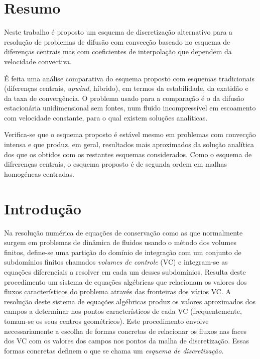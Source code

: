 \documentclass[11pt,twoside]{article}
\begin{document}
{\setlength{\parindent}{30pt}%

\small%
\section*{Resumo}
\smallskip
Neste trabalho é proposto um esquema de discretização alternativo para a
resolução de problemas de difusão com convecção baseado no esquema de diferenças
centrais mas com coeficientes de interpolação que dependem da velocidade
convectiva.

É feita uma análise comparativa do esquema proposto com esquemas tradicionais
(diferenças centrais, \emph{upwind}, híbrido), em termos da estabilidade, da
exatidão e da taxa de convergência. O problema usado para a comparação é o da
difusão estacionária unidimensional sem fontes, num fluido incompressível em
escoamento com velocidade constante, para o qual existem soluções analíticas.

Verifica-se que o esquema proposto é estável mesmo em problemas com convecção
intensa e que produz, em geral, resultados mais aproximados da solução analítica
dos que os obtidos com os restantes esquemas considerados. Como o esquema de
difrerenças centrais, o esquema proposto é de segunda ordem em malhas homogéneas
centradas.

\vspace{15pt}





\section{Introdução}
Na resolução numérica de equações de conservação como as que normalmente surgem
em problemas de dinâmica de fluidos usando o método dos volumes finitos,
define-se uma partição do domínio de integração com um conjunto de subdomínios
finitos chamados \emph{volumes de controle} (VC) e integram-se as equações
diferenciais a resolver em cada um desses subdomínios. Resulta deste
procedimento um sistema de equações algébricas que relacionam os valores dos
fluxos característicos do problema através das fronteiras dos vários VC. A
resolução deste sistema de equações algébricas produz os valores aproximados dos
campos a determinar nos pontos característicos de cada VC (frequentemente,
tomam-se os seus centros geométricos).  Este procedimento envolve
necessariamente a escolha de formas concretas de relacionar os fluxos nas faces
dos VC com os valores dos campos nos pontos da malha de discretização. Essas
formas concretas definem o que se chama um \emph{esquema de discretização.}

}
\end{document}
